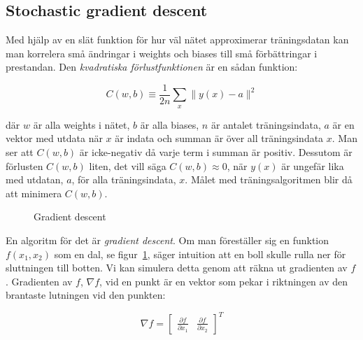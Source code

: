 \subsection{Stochastic gradient descent}
Med hjälp av en slät funktion för hur väl nätet approximerar träningsdatan
kan man korrelera små ändringar i weights och biases
till små förbättringar i prestandan.
Den \emph{kvadratiska förlustfunktionen} är en sådan funktion:

\begin{equation} \label{eq:cost}
	C(w, b) \equiv \frac{1}{2n} \displaystyle\sum_x \lVert y(x) - a \rVert^2
\end{equation}

där $ w $ är alla weights i nätet, $ b $ är alla biases,
$ n $ är antalet träningsindata, $ a $ är en vektor med utdata när $ x $ är indata
och summan är över all träningsindata $ x $.
Man ser att $ C(w, b) $ är icke-negativ då varje term i summan är positiv.
Dessutom är förlusten $ C(w, b) $ liten, det vill säga $ C(w, b) \approx 0 $,
när $ y(x) $ är ungefär lika med utdatan, $ a $, för alla träningsindata, $ x $.
Målet med träningsalgoritmen blir då att minimera $ C(w, b) $.

\begin{figure}
	\centering
	\caption{Gradient descent}
	\label{fig:descent}
\end{figure}

En algoritm för det är \emph{gradient descent}.
Om man föreställer sig en funktion $ f(x_1, x_2) $ som en dal,
se figur~\ref{fig:descent},
säger intuition att en boll skulle rulla ner för sluttningen till botten.
Vi kan simulera detta genom att räkna ut gradienten av $ f $.
Gradienten av $ f $, $ \nabla f $, vid en punkt är en vektor
som pekar i riktningen av den brantaste lutningen vid den punkten:

\begin{equation}
	\nabla f = \begin{bmatrix} \frac{\partial f}{\partial x_1} & \frac{\partial f}{\partial x_2} \end{bmatrix}^{T}
\end{equation}

